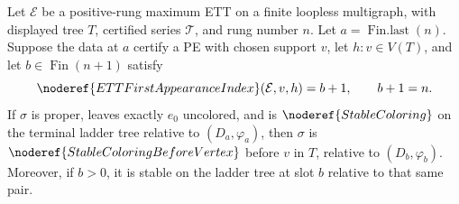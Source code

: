 \begin{helper}
Let \(\mathcal E\) be a positive-rung maximum ETT on a finite loopless
multigraph, with displayed tree \(T\), certified series \(\mathcal T\), and
rung number \(n\).  Let \(a=\operatorname{Fin.last}(n)\).  Suppose the data
at \(a\) certify a PE with chosen support \(v\), let \(h:v\in V(T)\), and let
\(b\in\operatorname{Fin}(n+1)\) satisfy
\[
 \noderef{ETTFirstAppearanceIndex}(\mathcal E,v,h)=b+1,
 \qquad b+1=n.
\]
If \(\sigma\) is proper, leaves exactly \(e_0\) uncolored, and is
\(\noderef{StableColoring}\) on the terminal ladder tree relative to
\((D_a,\varphi_a)\), then \(\sigma\) is
\(\noderef{StableColoringBeforeVertex}\) before \(v\) in \(T\), relative to
\((D_b,\varphi_b)\).  Moreover, if \(b>0\), it is stable on the ladder tree
at slot \(b\) relative to that same pair.
\end{helper}
